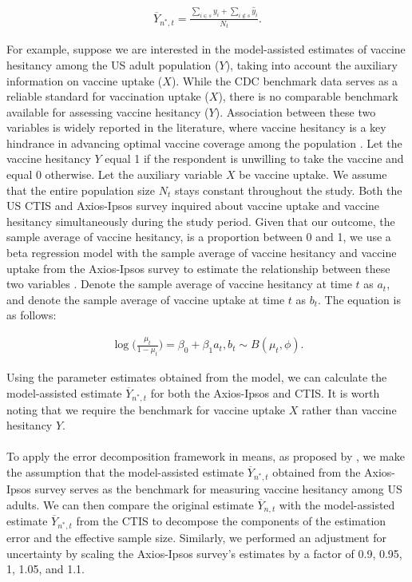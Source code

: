 \documentclass{article}
\begin{document}
\begin{align}
    \overline{Y}_{n^{*},t} = \frac{\sum_{i \in s} y_i + \sum_{i \not\in s} \hat{y}_i}{N_t}.
\end{align}

\noindent For example, suppose we are interested in the model-assisted estimates of vaccine hesitancy among the US adult population ($Y$), taking into account the auxiliary information on vaccine uptake ($X$). While the CDC benchmark data serves as a reliable standard for vaccination uptake ($X$), there is no comparable benchmark available for assessing vaccine hesitancy ($Y$). Association between these two variables is widely reported in the literature, where vaccine hesitancy is a key hindrance in advancing optimal vaccine coverage among the population \citep{Chutiyami2022-se, Rane2022-ds}. Let the vaccine hesitancy $Y$ equal 1 if the respondent is unwilling to take the vaccine and equal 0 otherwise. Let the auxiliary variable $X$ be vaccine uptake. We assume that the entire population size $N_t$ stays constant throughout the study. Both the US CTIS and Axios-Ipsos survey inquired about vaccine uptake and vaccine hesitancy simultaneously during the study period. Given that our outcome, the sample average of vaccine hesitancy, is a proportion between 0 and 1, we use a beta regression model with the sample average of vaccine hesitancy and vaccine uptake from the Axios-Ipsos survey to estimate the relationship between these two variables \citep{ferrari2004beta}. Denote the sample average of vaccine hesitancy at time $t$ as $a_t$, and denote the sample average of vaccine uptake at time $t$ as $b_t$. The equation is as follows:

\begin{align}
    \log \big( \frac{\mu_t}{1 - \mu_t} \big) = \beta_0 + \beta_1 a_t, b_t \sim B(\mu_t, \phi).
\end{align}

\noindent Using the parameter estimates obtained from the model, we can calculate the model-assisted estimate $\overline{Y}_{n^{*},t}$ for both the Axios-Ipsos and CTIS. It is worth noting that we require the benchmark for vaccine uptake $X$ rather than vaccine hesitancy $Y$.
\\
\\
To apply the error decomposition framework in means, as proposed by \cite{Meng2018}, we make the assumption that the model-assisted estimate $\overline{Y}_{n^{*},t}$ obtained from the Axios-Ipsos survey serves as the benchmark for measuring vaccine hesitancy among US adults. We can then compare the original estimate $\overline{Y}_{n,t}$ with the model-assisted estimate $\overline{Y}_{n^{*},t}$ from the CTIS to decompose the components of the estimation error and the effective sample size. Similarly, we performed an adjustment for uncertainty by scaling the Axios-Ipsos survey's estimates by a factor of 0.9, 0.95, 1, 1.05, and 1.1.
\end{document}
